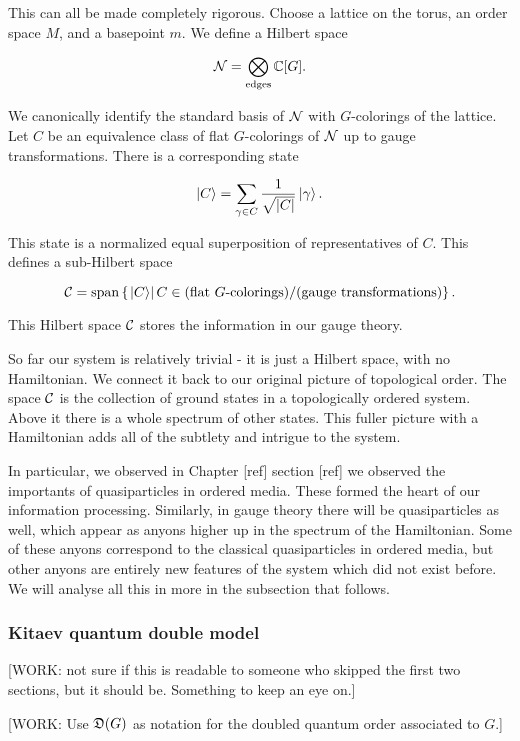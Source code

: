 This can all be made completely rigorous. Choose a lattice on the torus, an order space $M$, and a basepoint $m$. We define a Hilbert space

$$\mathcal{N}=\bigotimes_{\text{edges}}\mathbb{C}[G].$$

We canonically identify the standard basis of $\mathcal{N}$ with $G$-colorings of the lattice. Let $C$ be an equivalence class of flat $G$-colorings of $\mathcal{N}$ up to gauge transformations. There is a corresponding state

$$\ket{C}=\sum_{\gamma \in C}\frac{1}{\sqrt{|C|}}\ket{\gamma}.$$

This state is a normalized equal superposition of representatives of $C$. This defines a sub-Hilbert space

$$\mathcal{C}=\text{span}\left\{\left.\ket{C}\right| C\in \text{(flat $G$-colorings)}/\text{(gauge transformations)}\right\}.$$

This Hilbert space $\mathcal{C}$ stores the information in our gauge theory.

So far our system is relatively trivial - it is just a Hilbert space, with no Hamiltonian. We connect it back to our original picture of topological order. The space $\mathcal{C}$ is the collection of ground states in a topologically ordered system. Above it there is a whole spectrum of other states. This fuller picture with a Hamiltonian adds all of the subtlety and intrigue to the system.

In particular, we observed in Chapter [ref] section [ref] we observed the importants of quasiparticles in ordered media. These formed the heart of our information processing. Similarly, in gauge theory there will be quasiparticles as well, which appear as anyons higher up in the spectrum of the Hamiltonian. Some of these anyons correspond to the classical quasiparticles in ordered media, but other anyons are entirely new features of the system which did not exist before. We will analyse all this in more in the subsection that follows.

\subsubsection{Kitaev quantum double model}

[WORK: not sure if this is readable to someone who skipped the first two sections, but it should be. Something to keep an eye on.]

[WORK: Use $\mathfrak{D}(G)$ as notation for the doubled quantum order associated to $G$.]

